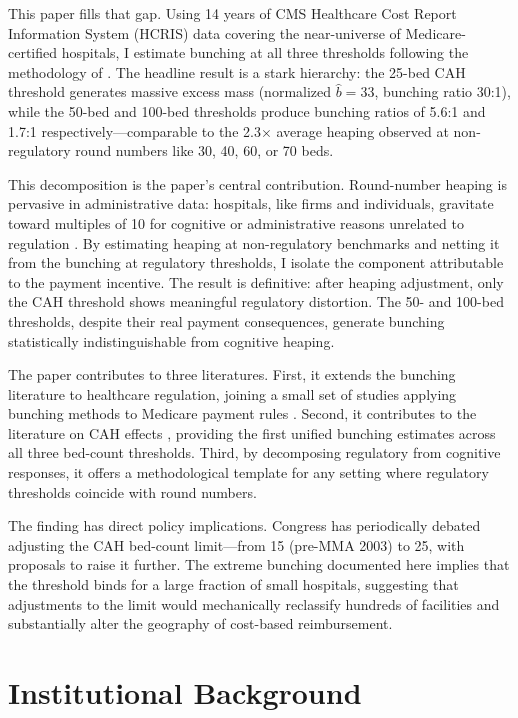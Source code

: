 \documentclass[12pt]{article}
\begin{document}
This paper fills that gap. Using 14 years of CMS Healthcare Cost Report Information System (HCRIS) data covering the near-universe of Medicare-certified hospitals, I estimate bunching at all three thresholds following the methodology of \citet{kleven2016}. The headline result is a stark hierarchy: the 25-bed CAH threshold generates massive excess mass (normalized $\hat{b} = 33$, bunching ratio 30:1), while the 50-bed and 100-bed thresholds produce bunching ratios of 5.6:1 and 1.7:1 respectively---comparable to the 2.3$\times$ average heaping observed at non-regulatory round numbers like 30, 40, 60, or 70 beds.

This decomposition is the paper's central contribution. Round-number heaping is pervasive in administrative data: hospitals, like firms and individuals, gravitate toward multiples of 10 for cognitive or administrative reasons unrelated to regulation \citep{kleven2016}. By estimating heaping at non-regulatory benchmarks and netting it from the bunching at regulatory thresholds, I isolate the component attributable to the payment incentive. The result is definitive: after heaping adjustment, only the CAH threshold shows meaningful regulatory distortion. The 50- and 100-bed thresholds, despite their real payment consequences, generate bunching statistically indistinguishable from cognitive heaping.

The paper contributes to three literatures. First, it extends the bunching literature \citep{kleven2016, saez2010, chetty2011} to healthcare regulation, joining a small set of studies applying bunching methods to Medicare payment rules \citep{bazzoli2018}. Second, it contributes to the literature on CAH effects \citep{gale2002, casey2015}, providing the first unified bunching estimates across all three bed-count thresholds. Third, by decomposing regulatory from cognitive responses, it offers a methodological template for any setting where regulatory thresholds coincide with round numbers.

The finding has direct policy implications. Congress has periodically debated adjusting the CAH bed-count limit---from 15 (pre-MMA 2003) to 25, with proposals to raise it further. The extreme bunching documented here implies that the threshold binds for a large fraction of small hospitals, suggesting that adjustments to the limit would mechanically reclassify hundreds of facilities and substantially alter the geography of cost-based reimbursement.

\section{Institutional Background}
\end{document}
